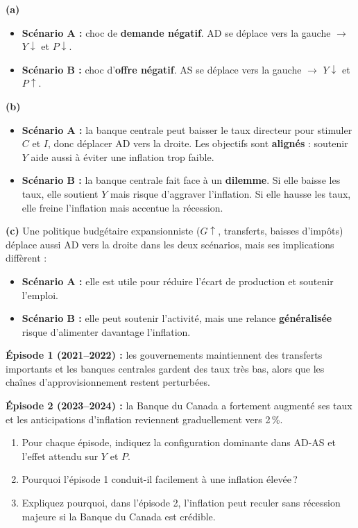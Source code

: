 \begin{reponse}
\textbf{(a)} 
\begin{itemize}
   \item \textbf{Scénario A :} choc de \textbf{demande négatif}. AD se déplace vers la gauche $\to$ $Y \downarrow$ et $P \downarrow$.
   \item \textbf{Scénario B :} choc d'\textbf{offre négatif}. AS se déplace vers la gauche $\to$ $Y \downarrow$ et $P \uparrow$.
\end{itemize}

\textbf{(b)} 
\begin{itemize}
   \item \textbf{Scénario A :} la banque centrale peut baisser le taux directeur pour stimuler $C$ et $I$, donc déplacer AD vers la droite. Les objectifs sont \textbf{alignés} : soutenir $Y$ aide aussi à éviter une inflation trop faible.
   \item \textbf{Scénario B :} la banque centrale fait face à un \textbf{dilemme}. Si elle baisse les taux, elle soutient $Y$ mais risque d'aggraver l'inflation. Si elle hausse les taux, elle freine l'inflation mais accentue la récession.
\end{itemize}

\textbf{(c)} Une politique budgétaire expansionniste ($G \uparrow$, transferts, baisses d'impôts) déplace aussi AD vers la droite dans les deux scénarios, mais ses implications diffèrent :
\begin{itemize}
   \item \textbf{Scénario A :} elle est utile pour réduire l'écart de production et soutenir l'emploi.
   \item \textbf{Scénario B :} elle peut soutenir l'activité, mais une relance \textbf{généralisée} risque d'alimenter davantage l'inflation.
\end{itemize}
\end{reponse}


\textbf{Épisode 1 (2021--2022) :} les gouvernements maintiennent des transferts importants et les banques centrales gardent des taux très bas, alors que les chaînes d'approvisionnement restent perturbées.

\textbf{Épisode 2 (2023--2024) :} la Banque du Canada a fortement augmenté ses taux et les anticipations d'inflation reviennent graduellement vers 2\,\%.

\begin{enumerate}[label=(\alph*)]
   \item Pour chaque épisode, indiquez la configuration dominante dans AD-AS et l'effet attendu sur $Y$ et $P$.
   \item Pourquoi l'épisode 1 conduit-il facilement à une inflation élevée\,?
   \item Expliquez pourquoi, dans l'épisode 2, l'inflation peut reculer sans récession majeure si la Banque du Canada est crédible.
\end{enumerate}

